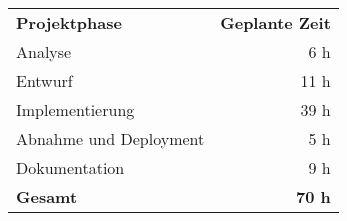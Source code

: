 \begin{tabular}{lr}
\rowcolor{heading}\textbf{Projektphase} & \textbf{Geplante Zeit} \\
Analyse & 6 h \\
\rowcolor{odd}Entwurf & 11 h \\
Implementierung & 39 h \\
\rowcolor{odd}Abnahme und Deployment & 5 h \\
Dokumentation & 9 h \\
\hline
\hline
\rowcolor{heading}\textbf{Gesamt} & \textbf{70 h} \\
\end{tabular}
